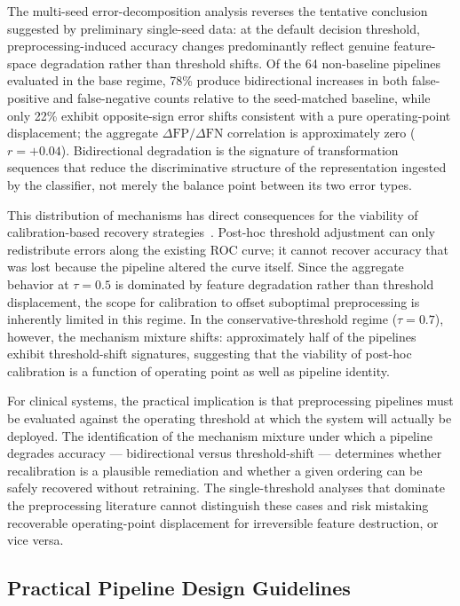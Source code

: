 \documentclass[preprint,5p,times,twocolumn]{elsarticle}
\begin{document}
The multi-seed error-decomposition analysis reverses the tentative conclusion suggested by preliminary single-seed data: at the default decision threshold, preprocessing-induced accuracy changes predominantly reflect genuine feature-space degradation rather than threshold shifts. Of the 64 non-baseline pipelines evaluated in the base regime, 78\% produce bidirectional increases in both false-positive and false-negative counts relative to the seed-matched baseline, while only 22\% exhibit opposite-sign error shifts consistent with a pure operating-point displacement; the aggregate $\Delta\text{FP}/\Delta\text{FN}$ correlation is approximately zero ($r = +0.04$). Bidirectional degradation is the signature of transformation sequences that reduce the discriminative structure of the representation ingested by the classifier, not merely the balance point between its two error types.

This distribution of mechanisms has direct consequences for the viability of calibration-based recovery strategies~\cite{Liang2022, Guo2017}. Post-hoc threshold adjustment can only redistribute errors along the existing ROC curve; it cannot recover accuracy that was lost because the pipeline altered the curve itself. Since the aggregate behavior at $\tau = 0.5$ is dominated by feature degradation rather than threshold displacement, the scope for calibration to offset suboptimal preprocessing is inherently limited in this regime. In the conservative-threshold regime ($\tau = 0.7$), however, the mechanism mixture shifts: approximately half of the pipelines exhibit threshold-shift signatures, suggesting that the viability of post-hoc calibration is a function of operating point as well as pipeline identity.

For clinical systems, the practical implication is that preprocessing pipelines must be evaluated against the operating threshold at which the system will actually be deployed. The identification of the mechanism mixture under which a pipeline degrades accuracy --- bidirectional versus threshold-shift --- determines whether recalibration is a plausible remediation and whether a given ordering can be safely recovered without retraining. The single-threshold analyses that dominate the preprocessing literature cannot distinguish these cases and risk mistaking recoverable operating-point displacement for irreversible feature destruction, or vice versa.

\subsection{Practical Pipeline Design Guidelines}
\end{document}
